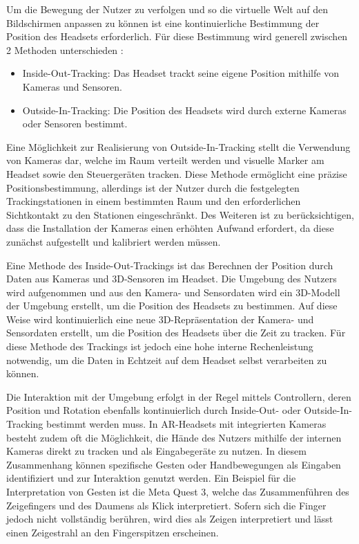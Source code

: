     Um die Bewegung der Nutzer zu verfolgen und so die virtuelle Welt auf den Bildschirmen anpassen zu können ist eine kontinuierliche Bestimmung der Position des Headsets erforderlich.
    Für diese Bestimmung wird generell zwischen 2 Methoden unterschieden \autocite[]{Gourlay2017}:
    \begin{itemize}
      \item Inside-Out-Tracking: Das Headset trackt seine eigene Position mithilfe von Kameras und Sensoren.
      \item Outside-In-Tracking: Die Position des Headsets wird durch externe Kameras oder Sensoren bestimmt.
    \end{itemize}

    Eine Möglichkeit zur Realisierung von Outside-In-Tracking stellt die Verwendung von Kameras dar, welche im Raum verteilt werden und visuelle Marker am Headset sowie den Steuergeräten tracken.
    Diese Methode ermöglicht eine präzise Positionsbestimmung, allerdings ist der Nutzer durch die festgelegten Trackingstationen in einem bestimmten Raum und den erforderlichen Sichtkontakt zu den Stationen eingeschränkt.
    Des Weiteren ist zu berücksichtigen, dass die Installation der Kameras einen erhöhten Aufwand erfordert, da diese zunächst aufgestellt und kalibriert werden müssen.

    Eine Methode des Inside-Out-Trackings ist das Berechnen der Position durch Daten aus Kameras und 3D-Sensoren im Headset.
    Die Umgebung des Nutzers wird aufgenommen und aus den Kamera- und Sensordaten wird ein 3D-Modell der Umgebung erstellt, um die Position des Headsets zu bestimmen.
    Auf diese Weise wird kontinuierlich eine neue 3D-Repräsentation der Kamera- und Sensordaten erstellt, um die Position des Headsets über die Zeit zu tracken.
    Für diese Methode des Trackings ist jedoch eine hohe interne Rechenleistung notwendig, um die Daten in Echtzeit auf dem Headset selbst verarbeiten zu können.

    Die Interaktion mit der Umgebung erfolgt in der Regel mittels Controllern, deren Position und Rotation ebenfalls kontinuierlich durch Inside-Out- oder Outside-In-Tracking bestimmt werden muss.
    In AR-Headsets mit integrierten Kameras besteht zudem oft die Möglichkeit, die Hände des Nutzers mithilfe der internen Kameras direkt zu tracken und als Eingabegeräte zu nutzen.
    In diesem Zusammenhang können spezifische Gesten oder Handbewegungen als Eingaben identifiziert und zur Interaktion genutzt werden.
    Ein Beispiel für die Interpretation von Gesten ist die Meta Quest 3, welche das Zusammenführen des Zeigefingers und des Daumens als Klick interpretiert.
    Sofern sich die Finger jedoch nicht vollständig berühren, wird dies als Zeigen interpretiert und lässt einen Zeigestrahl an den Fingerspitzen erscheinen.
    
